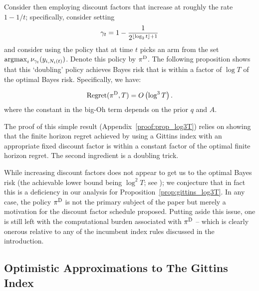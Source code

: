 Consider then employing discount factors that increase at roughly the rate $1 - 1/t$; specifically, consider setting 
\[
\gamma_t = 
1 - 
\frac{1}
{2^{\lfloor\log_2 t\rfloor+1}}
\]
and consider using the policy that at time $t$ picks an arm from the set $\operatorname*{\mathrm{argmax}}_i \nu_{\gamma_t}(y_{i,N_i(t)})$. Denote this policy by $\pi^{\rm D}$. The following proposition shows that this `doubling' policy achieves Bayes risk that is within a factor of $\log T$ of the optimal Bayes risk. Specifically, we have:
\begin{proposition}
	\label{prop:gittins_log3T}
	\[
	{\rm Regret}(\pi^{\rm D},T)
	=
	O
	\left(
	\log^3 T
	\right).
	\] 
	where the constant in the big-Oh term depends on the prior $q$ and $A$.
\end{proposition}
The proof of this simple result (Appendix~\ref{proof:prop_log3T}) relies on showing that the finite horizon regret achieved by using a Gittins index with an appropriate fixed discount factor is within a constant factor of the optimal finite horizon regret. The second ingredient is a doubling trick.

While increasing discount factors does not appear to get us to the optimal Bayes risk (the achievable lower bound being $\log^2T$; see \cite{lai1987adaptive}); we conjecture that in fact this is a deficiency in our analysis for Proposition~\ref{prop:gittins_log3T}. In any case, the policy $\pi^{\rm D}$ is not the primary subject of the paper but merely a motivation for the discount factor schedule proposed. Putting aside this issue, one is still left with the computational burden associated with $\pi^{\rm D}$ -- which is clearly onerous relative to any of the incumbent index rules discussed in the introduction. 

\subsection{Optimistic Approximations to The Gittins Index}\label{sec:approx_agi_deriv}

